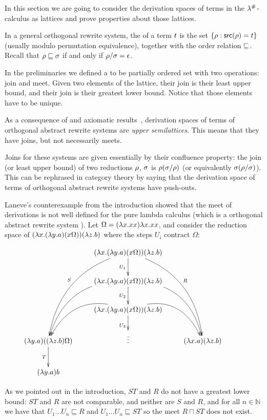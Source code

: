 In this section we are going to consider the derivation spaces of terms in
the $\lambda^{\mathtt{\#}}$-calculus as lattices and prove properties about those lattices.

In a general orthogonal rewrite system,
the  of a term $t$ is the set
$\{\rho : \mathsf{src}(\rho) = t\}$ (usually modulo permutation equivalence),
together with the order relation $\sqsubseteq$.
Recall that
$\rho \sqsubseteq \sigma$ if and only if $\rho / \sigma = \epsilon$.

In the preliminaries we defined a  to be partially ordered set with two operations:
join and meet. Given two elements of the lattice, their join is their least upper bound,
and their join is their greatest lower bound. Notice that those elements have to be unique.

As a consequence of
and axiomatic results~\cite{thesismellies},
derivation spaces of terms of orthogonal abstract rewrite systems are
\emph{upper semilattices}. This means that they have joins, but not necessarily meets.

Joins for these systems are given essentially by their confluence property:
the join (or least upper bound)
of two reductions $\rho$, $\sigma$ is $\rho (\sigma / \rho)$
(or equivalently $\sigma (\rho / \sigma)$).
This can be rephrased in category theory by saying that the derivation space of
terms of orthogonal abstract rewrite systems have push-outs.

\begin{example} Laneve's counterexample from the introduction
showed that the meet of derivations is not well defined for the pure lambda calculus
(which is a orthogonal abstract rewrite system \cite{thesismellies}).
Let $\Omega = (\lambda x. xx)\lambda x. xx$,
and consider the reduction space of
$(\lambda x. (\lambda y. a)(x \Omega)) (\lambda z. b)$
where the steps $U_i$ contract $\Omega$:

\[
  \xymatrix{
    &
    (\lam{\var}{(\lam{\vartwo}{a})(\var \Omega)}) (\lam{\varthree}{b})
    \ar_{U_1}[d]
    \ar@/_1cm/_{S}[dddl]
    \ar@/^1cm/^{R}[dddr]
    &
  \\
    &
    (\lam{\var}{(\lam{\vartwo}{a})(\var \Omega)}) (\lam{\varthree}{b})
    \ar@/_1cm/[ddl] \ar@/^1cm/[ddr]
    \ar_{U_2}[d]
    &
  \\
    &
    (\lam{\var}{(\lam{\vartwo}{a})(\var \Omega)}) (\lam{\varthree}{b})
    \ar@/_1cm/[dl] \ar@/^1cm/[dr]
    \ar_{U_3}[d]
    &
  \\
    (\lam{\vartwo}{a})((\lam{\varthree}{b}) \Omega)
    \ar_{T}[d]
    &
    \vdots
    &
    (\lam{\var}{a})(\lam{\varthree}{b})
  \\
    (\lam{\vartwo}{a}) b
    &
    &
    &
  }
\]

As we pointed out in the introduction,
$ST$ and $R$ do not have a greatest lower bound: $ST$ and $R$ are not
comparable, and neither are $S$ and $R$,
and for all $n \in \mathbb{N}$ we have that $U_1 \hdots U_n \sqsubseteq R$
and $U_1 \hdots U_n \sqsubseteq ST$ so the meet $R \sqcap ST$ does not exist.
\end{example}

